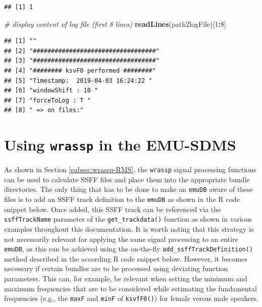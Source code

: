\documentclass[]{book}
\newenvironment{Shaded}{\begin{snugshade}}{\end{snugshade}}
\newcommand{\CommentTok}[1]{\textcolor[rgb]{0.56,0.35,0.01}{\textit{#1}}}
\newcommand{\DecValTok}[1]{\textcolor[rgb]{0.00,0.00,0.81}{#1}}
\newcommand{\KeywordTok}[1]{\textcolor[rgb]{0.13,0.29,0.53}{\textbf{#1}}}
\newcommand{\NormalTok}[1]{#1}
\newcommand{\OperatorTok}[1]{\textcolor[rgb]{0.81,0.36,0.00}{\textbf{#1}}}
\begin{document}
\begin{verbatim}
## [1] 1
\end{verbatim}

\begin{Shaded}
\begin{Highlighting}[]
\CommentTok{# display content of log file (first 8 lines)}
\KeywordTok{readLines}\NormalTok{(path2logFile)[}\DecValTok{1}\OperatorTok{:}\DecValTok{8}\NormalTok{]}
\end{Highlighting}
\end{Shaded}

\begin{verbatim}
## [1] ""                                  
## [2] "##################################"
## [3] "##################################"
## [4] "######## ksvF0 performed ########" 
## [5] "Timestamp:  2019-04-03 16:24:22 "  
## [6] "windowShift : 10 "                 
## [7] "forceToLog : T "                   
## [8] " => on files:"
\end{verbatim}

\hypertarget{sec:wrassp-emu-sdms}{%
\section{\texorpdfstring{Using \texttt{wrassp} in the EMU-SDMS}{Using wrassp in the EMU-SDMS}}\label{sec:wrassp-emu-sdms}}

As shown in Section \ref{subsec:wrassp-RMS}, the \texttt{wrassp} signal processing functions can be used to calculate SSFF files and place them into the appropriate bundle directories. The only thing that has to be done to make an \texttt{emuDB} aware of these files is to add an SSFF track definition to the \texttt{emuDB} as shown in the R code snippet below. Once added, this SSFF track can be referenced via the \texttt{ssffTrackName} parameter of the \texttt{get\_trackdata()} function as shown in various examples throughout this documentation. It is worth noting that this strategy is not necessarily relevant for applying the same signal processing to an entire \texttt{emuDB}, as this can be achieved using the on-the-fly \texttt{add\_ssffTrackDefinition()} method described in the according R code snippet below. However, it becomes necessary if certain bundles are to be processed using deviating function parameters. This can, for example, be relevant when setting the minimum and maximum frequencies that are to be considered while estimating the fundamental frequencies (e.g., the \texttt{maxF} and \texttt{minF} of \texttt{ksvfF0()}) for female versus male speakers.
\end{document}
